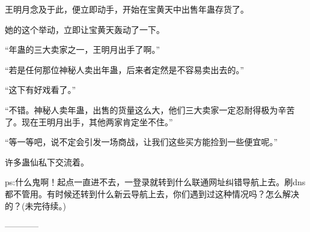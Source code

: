\begin{this_body}
王明月念及于此，便立即动手，开始在宝黄天中出售年蛊存货了。

她的这个举动，立即让宝黄天轰动了一下。

“年蛊的三大卖家之一，王明月出手了啊。”

“若是任何那位神秘人卖出年蛊，后来者定然是不容易卖出去的。”

“这下有好戏看了。”

“不错。神秘人卖年蛊，出售的货量这么大，他们三大卖家一定忍耐得极为辛苦了。现在王明月出手，其他两家肯定坐不住。”

“等一等吧，说不定会引发一场商战，让我们这些买方能捡到一些便宜呢。”

许多蛊仙私下交流着。

ps:什么鬼啊！起点一直进不去，一登录就转到什么联通网址纠错导航上去。刷dns都不管用。有时候还转到什么新云导航上去，你们遇到过这种情况吗？怎么解决的？(未完待续。)

------------

\end{this_body}

